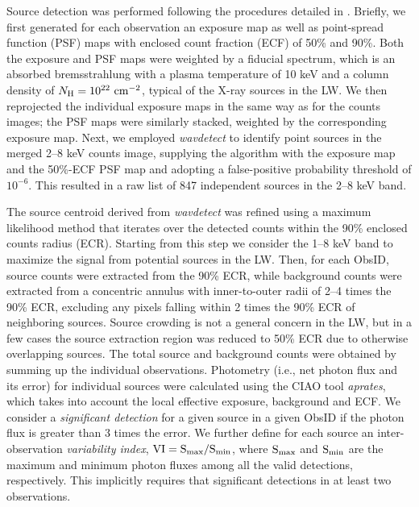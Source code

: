 \documentclass[twoside,twocolumn]{aastex63}
\begin{document}
Source detection was performed following the procedures detailed in \citet{2018ApJS..235...26Z}.
Briefly, we first generated for each observation an exposure map as well as point-spread function (PSF) maps with enclosed count fraction (ECF) of 50\% and 90\%. 
Both the exposure and PSF maps were weighted by a fiducial spectrum, which is an absorbed bremsstrahlung with a plasma temperature of 10 keV and a column density of $N_{\rm H}=10^{22}{\rm~cm^{-2}}$, typical of the X-ray sources in the LW. 
We then reprojected the individual exposure maps in the same way as for the counts images; the PSF maps were similarly stacked, weighted by the corresponding exposure map. 
Next, we employed {\it wavdetect} to identify point sources in the merged 2--8 keV counts image, supplying the algorithm  with the exposure map and the 50\%-ECF PSF map and adopting a false-positive probability threshold of $10^{-6}$. 
This resulted in a raw list of 847 independent sources in the 2--8 keV band. 

The source centroid derived from {\it wavdetect} was refined using a maximum likelihood method that iterates over the detected counts within the 90\% enclosed counts radius (ECR).
Starting from this step we consider the 1--8 keV band to maximize the signal from potential sources in the LW. 
Then, for each ObsID, source counts were extracted from the 90\% ECR, while background counts were extracted from a concentric annulus with inner-to-outer radii of 2--4 times the 90\% ECR, excluding any pixels falling within 2 times the 90\% ECR of neighboring sources.
Source crowding is not a general concern in the LW, but in a few cases the source extraction region was reduced to 50\% ECR due to otherwise overlapping sources. 
The total source and background counts were obtained by summing up the individual observations. 
Photometry (i.e., net photon flux and its error) for individual sources were calculated using the CIAO tool \emph{aprates}, which takes into account the local effective exposure, background and ECF. 
We consider a {\it significant detection} for a given source in a given ObsID if the photon flux is greater than 3 times the error. 
We further define for each source an inter-observation {\it variability index}, $\rm VI=S_{max}/S_{min}$, where $\rm S_{max}$ and $\rm S_{min}$ are the maximum and minimum photon fluxes among all the valid detections, respectively. This implicitly requires that significant detections in at least two observations.
\end{document}
